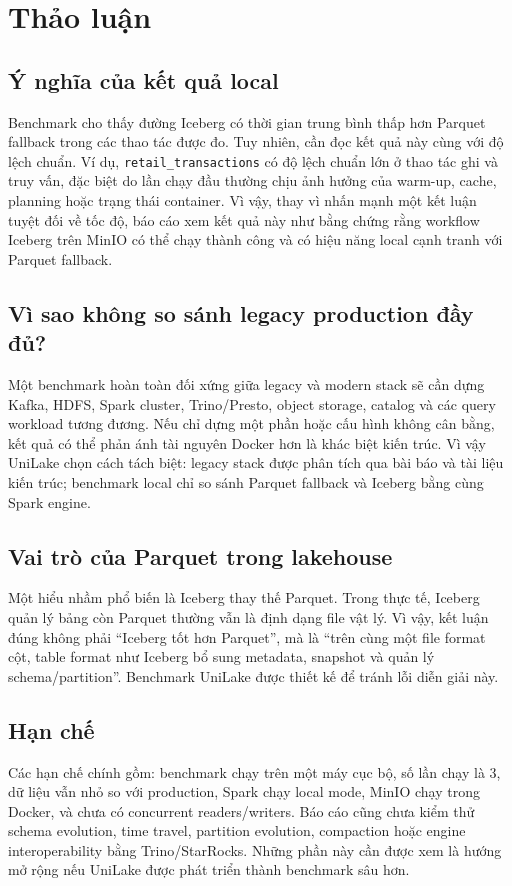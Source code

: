 \section{Thảo luận}

\subsection{Ý nghĩa của kết quả local}

Benchmark cho thấy đường Iceberg có thời gian trung bình thấp hơn Parquet fallback trong các thao tác được đo. Tuy nhiên, cần đọc kết quả này cùng với độ lệch chuẩn. Ví dụ, \texttt{retail\_transactions} có độ lệch chuẩn lớn ở thao tác ghi và truy vấn, đặc biệt do lần chạy đầu thường chịu ảnh hưởng của warm-up, cache, planning hoặc trạng thái container. Vì vậy, thay vì nhấn mạnh một kết luận tuyệt đối về tốc độ, báo cáo xem kết quả này như bằng chứng rằng workflow Iceberg trên MinIO có thể chạy thành công và có hiệu năng local cạnh tranh với Parquet fallback.

\subsection{Vì sao không so sánh legacy production đầy đủ?}

Một benchmark hoàn toàn đối xứng giữa legacy và modern stack sẽ cần dựng Kafka, HDFS, Spark cluster, Trino/Presto, object storage, catalog và các query workload tương đương. Nếu chỉ dựng một phần hoặc cấu hình không cân bằng, kết quả có thể phản ánh tài nguyên Docker hơn là khác biệt kiến trúc. Vì vậy UniLake chọn cách tách biệt: legacy stack được phân tích qua bài báo và tài liệu kiến trúc; benchmark local chỉ so sánh Parquet fallback và Iceberg bằng cùng Spark engine.

\subsection{Vai trò của Parquet trong lakehouse}

Một hiểu nhầm phổ biến là Iceberg thay thế Parquet. Trong thực tế, Iceberg quản lý bảng còn Parquet thường vẫn là định dạng file vật lý. Vì vậy, kết luận đúng không phải ``Iceberg tốt hơn Parquet'', mà là ``trên cùng một file format cột, table format như Iceberg bổ sung metadata, snapshot và quản lý schema/partition''. Benchmark UniLake được thiết kế để tránh lỗi diễn giải này.

\subsection{Hạn chế}

Các hạn chế chính gồm: benchmark chạy trên một máy cục bộ, số lần chạy là 3, dữ liệu vẫn nhỏ so với production, Spark chạy local mode, MinIO chạy trong Docker, và chưa có concurrent readers/writers. Báo cáo cũng chưa kiểm thử schema evolution, time travel, partition evolution, compaction hoặc engine interoperability bằng Trino/StarRocks. Những phần này cần được xem là hướng mở rộng nếu UniLake được phát triển thành benchmark sâu hơn.
